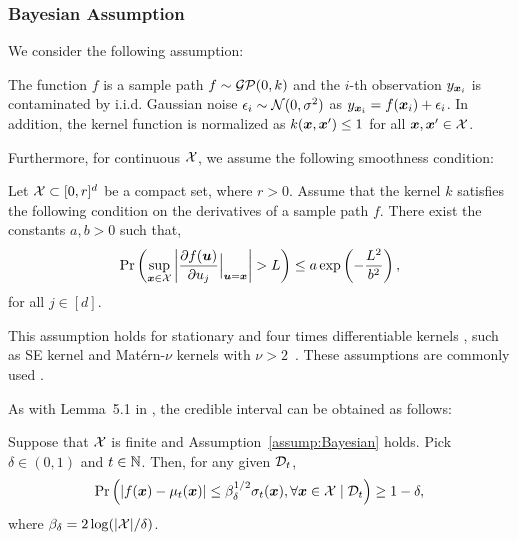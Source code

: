 \subsubsection{Bayesian Assumption}

We consider the following assumption:
\begin{assumption}
    The function $f$ is a sample path $f \sim {\cal G} {\cal P} (0, k)$ and the $i$-th observation $y_{\boldsymbol{x}_i}$ is contaminated by i.i.d. Gaussian noise $\epsilon_i \sim {\cal N}(0, \sigma^2)$ as $y_{\boldsymbol{x}_i} = f(\boldsymbol{x}_i) + \epsilon_i$.
    In addition, the kernel function is normalized as $k(\boldsymbol{x}, \boldsymbol{x}^\prime) \leq 1$ for all $\boldsymbol{x}, \boldsymbol{x}^\prime \in {\cal X}$.
    \label{assump:Bayesian}
\end{assumption}
%
Furthermore, for continuous ${\cal X}$, we assume the following smoothness condition:
\begin{assumption}
    Let ${\cal X} \subset [0, r]^d$ be a compact set, where $r > 0$.
    Assume that the kernel $k$ satisfies the following condition on the derivatives of a sample path $f$.
    There exist the constants $a, b > 0$ such that,
    \begin{align*}
        \Pr \left( \sup_{\boldsymbol{x} \in {\cal X}} \left| \frac{\partial f(\boldsymbol{u})}{\partial u_j} \Big|_{\boldsymbol{u}=\boldsymbol{x}} \right| > L \right) \leq a \exp \left( - \frac{L^2}{b^2} \right),
    \end{align*}
    for all $j \in [d]$.
    \label{assump:Bayesian_continuous}
\end{assumption}
%
This assumption holds for stationary and four times differentiable kernels \citep[Theorem~5 of][]{Ghosal2006-posterior}, such as SE kernel and Mat\'{e}rn-$\nu$ kernels with $\nu > 2$~\citep[Section~4 of][]{Srinivas2010-Gaussian}.
%
These assumptions are commonly used \citep{Srinivas2010-Gaussian,Kandasamy2018-Parallelised,paria2020-flexible,Takeno2023-randomized,takeno2024-posterior}.



As with Lemma~5.1 in \citet{Srinivas2010-Gaussian}, the credible interval can be obtained as follows:
\begin{lemma}
    Suppose that ${\cal X}$ is finite and Assumption~\ref{assump:Bayesian} holds.
    Pick $\delta \in (0, 1)$ and $t \in \mathbb{N}$.
    Then, for any given ${\cal D}_{t}$,
    \begin{align*}
        \Pr \left( |f(\boldsymbol{x}) - \mu_{t}(\boldsymbol{x}) | \leq \beta^{1/2}_{\delta} \sigma_{t}(\boldsymbol{x}), \forall \boldsymbol{x} \in {\cal X} \mid {\cal D}_{t} \right)
        \geq 1 - \delta,
    \end{align*}
    where $\beta_{\delta} = 2 \log (|{\cal X}| / \delta)$.
    \label{lem:bound_srinivas}
\end{lemma}



